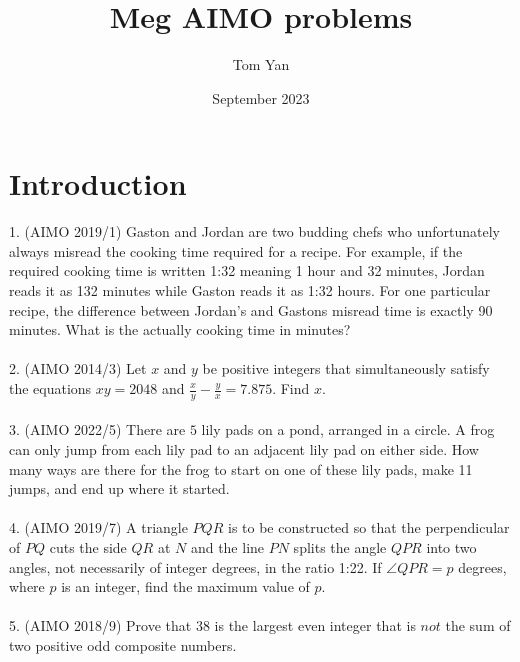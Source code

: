 \documentclass{article}
\title{Meg AIMO problems}
\author{Tom Yan}
\date{September 2023}
\begin{document}
\maketitle

\section{Introduction}
1. (AIMO 2019/1) Gaston and Jordan are two budding chefs who unfortunately always misread the cooking time required for a recipe. For example, if the required cooking time is written 1:32 meaning 1 hour and 32 minutes, Jordan reads it as 132 minutes while Gaston reads it as 1:32 hours. For one particular recipe, the difference between Jordan's and Gastons misread time is exactly 90 minutes. What is the actually cooking time in minutes?  \\\\
2. (AIMO 2014/3) Let $x$ and $y$ be positive integers that simultaneously satisfy the equations $xy=2048$ and $\frac{x}{y}-\frac{y}{x}=7.875$. Find $x$.  \\\\
3. (AIMO 2022/5) There are $5$ lily pads on a pond, arranged in a circle. A frog can only jump from each lily pad to an adjacent lily pad on either side. How many ways are there for the frog to start on one of these lily pads, make 11 jumps, and end up where it started. \\\\
4. (AIMO 2019/7) A triangle $PQR$ is to be constructed so that the perpendicular of $PQ$ cuts the side $QR$ at $N$ and the line $PN$ splits the angle $QPR$ into two angles, not necessarily of integer degrees, in the ratio 1:22. If $\angle QPR = p$ degrees, where $p$ is an integer, find the maximum value of $p$.  \\\\
5. (AIMO 2018/9) Prove that 38 is the largest even integer that is $not$ the sum of two positive odd composite numbers. \\\\
\end{document}
